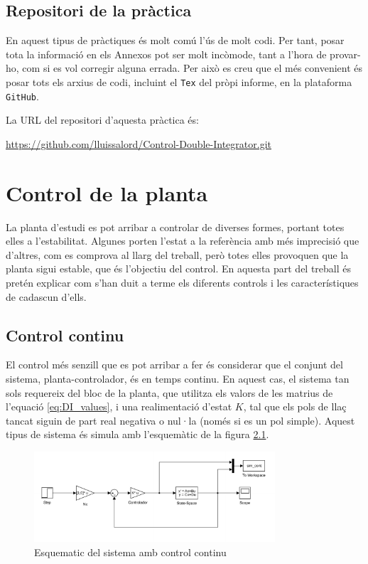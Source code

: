 \documentclass[12pt,a4paper,final,twoside,openright]{report}
\begin{document}
\section{Repositori de la pràctica}\label{sec:github}
En aquest tipus de pràctiques és molt comú l'ús de molt codi. Per tant, posar tota la informació en els Annexos pot ser molt incòmode, tant a l'hora de provar-ho, com si es vol corregir alguna errada. Per això es creu que el més convenient és posar tots els arxius de codi, incluint el \texttt{Tex} del pròpi informe, en la plataforma \texttt{GitHub}.

La URL del repositori d'aquesta pràctica és:

\url{https://github.com/lluissalord/Control-Double-Integrator.git}

\chapter{Control de la planta}

La planta d'estudi es pot arribar a controlar de diverses formes, portant totes elles a l'estabilitat. Algunes porten l'estat a la referència amb més imprecisió que d'altres, com es comprova al llarg del treball, però totes elles provoquen que la planta sigui estable, que és l'objectiu del control. En aquesta part del treball és pretén explicar com s'han duit a terme els diferents controls i les característiques de cadascun d'ells.

\section{Control continu}

El control més senzill que es pot arribar a fer és considerar que el conjunt del sistema, planta-controlador, és en temps continu. En aquest cas, el sistema tan sols requereix del bloc de la planta, que utilitza els valors de les matrius de l'equació \eqref{eq:DI_values}, i una realimentació d'estat $K$, tal que els pols de llaç tancat siguin de part real negativa o nul·la (només si es un pol simple). Aquest tipus de sistema és simula amb l'esquemàtic de la figura \ref{fig:cont_scheme}.

\begin{figure}
\centering
\includegraphics[width=0.8\textwidth]{Imatges/cont_sim_scheme.pdf}
\caption{Esquematic del sistema amb control continu\label{fig:cont_scheme}}
\end{figure}
\end{document}
